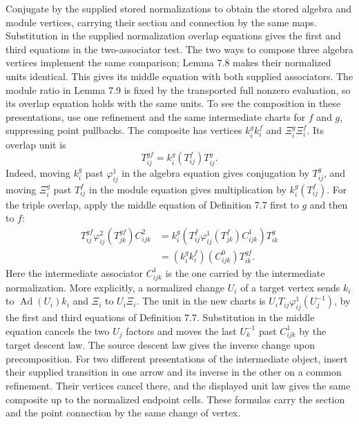 \documentclass[
  english,
  11pt,
  reqno]{amsart}
\begin{document}
Conjugate by the supplied stored normalizations to obtain the stored
algebra and module vertices, carrying their section and connection by
the same maps. Substitution in the supplied normalization overlap
equations gives the first and third equations in the two-associator
test. The two ways to compose three algebra vertices implement the same
comparison; Lemma 7.8 makes their normalized units identical. This gives
its middle equation with both supplied associators. The module ratio in
Lemma 7.9 is fixed by the transported full nonzero evaluation, so its
overlap equation holds with the same units. To see the composition in
these presentations, use one refinement and the same intermediate charts
for \(f\) and \(g\), suppressing point pullbacks. The composite has
vertices \(k_i^g k_i^f\) and \(\Xi_i^g\Xi_i^f\). Its overlap unit is \[
T^{gf}_{ij}=k_i^g(T^f_{ij})T^g_{ij}.
\] Indeed, moving \(k_i^g\) past \(\varphi^1_{ij}\) in the algebra
equation gives conjugation by \(T^g_{ij}\), and moving \(\Xi_i^g\) past
\(T^f_{ij}\) in the module equation gives multiplication by
\(k_i^g(T^f_{ij})\). For the triple overlap, apply the middle equation
of Definition 7.7 first to \(g\) and then to \(f\): \[
\begin{aligned}
T^{gf}_{ij}\varphi^2_{ij}(T^{gf}_{jk})C^2_{ijk}
 &= k_i^g\!\left(T^f_{ij}\varphi^1_{ij}(T^f_{jk})C^1_{ijk}\right)T^g_{ik}\\
 &= (k_i^g k_i^f)(C^0_{ijk})T^{gf}_{ik}.
\end{aligned}
\] Here the intermediate associator \(C^1_{ijk}\) is the one carried by
the intermediate normalization. More explicitly, a normalized change
\(U_i\) of a target vertex sends \(k_i\) to
\(\operatorname{Ad}(U_i)k_i\) and \(\Xi_i\) to \(U_i\Xi_i\). The unit in
the new charts is \(U_iT_{ij}\varphi^1_{ij}(U_j^{-1})\), by the first
and third equations of Definition 7.7. Substitution in the middle
equation cancels the two \(U_j\) factors and moves the last \(U_k^{-1}\)
past \(C^1_{ijk}\) by the target descent law. The source descent law
gives the inverse change upon precomposition. For two different
presentations of the intermediate object, insert their supplied
transition in one arrow and its inverse in the other on a common
refinement. Their vertices cancel there, and the displayed unit law
gives the same composite up to the normalized endpoint cells. These
formulas carry the section and the point connection by the same change
of vertex.
\end{document}
